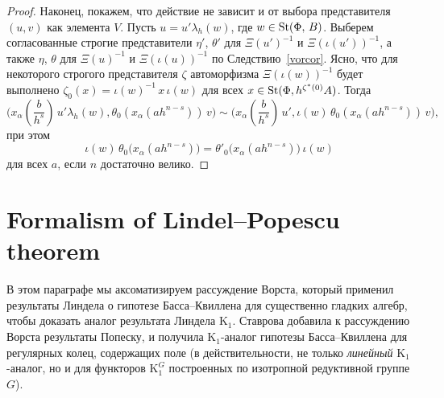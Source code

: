 \documentclass[oneside, 11pt]{amsart} \pdfoutput=1
\begin{document}
\begin{proof}
Наконец, покажем, что действие не зависит и от выбора представителя $(u, v)$ как элемента $V$. Пусть $u = u' \lambda_h(w)$, где $w \in \mathop{\mathrm{St}}\nolimits(\Phi,\,B)$. Выберем согласованные строгие представители $\eta'$, $\theta'$ для $\Xi(u')^{-1}$ и $\Xi(\iota(u'))^{-1}$, а также $\eta$, $\theta$ для $\Xi(u)^{-1}$ и $\Xi(\iota(u))^{-1}$ по Следствию~\ref{vorcor}. Ясно, что для некоторого строгого представителя $\zeta$ автоморфизма $\Xi(\iota(w))^{-1}$ будет выполнено $\zeta_0(x) = \iota(w)^{-1}\, x\, \iota(w)$ для всех $x \in \mathop{\mathrm{St}}\nolimits(\Phi, h^{\zeta^*(0)} A)$.
Тогда
$$\textstyle
\bigl(x_\alpha(\frac b {h^s})\, u' \lambda_h(w), \theta_0(x_\alpha(ah^{n - s}))\, v\bigr) \sim \bigl(x_\alpha(\frac b {h^s})\, u', \iota(w)\, \theta_0(x_\alpha(ah^{n - s}))\, v\bigr),
$$
при этом
$$
\iota(w)\, \theta_0\big(x_\alpha(ah^{n-s})\big) = \theta'_0\big(x_\alpha(ah^{n-s})\big)\, \iota(w)
$$
для всех \(a\), если \(n\) достаточно велико.
\end{proof}










\section{Formalism of Lindel--Popescu theorem}
В этом параграфе мы аксоматизируем рассуждение Ворста, который применил результаты Линдела о гипотезе Басса--Квиллена для существенно гладких алгебр, чтобы доказать аналог результата Линдела $\mathrm K_1$. Ставрова добавила к рассуждению Ворста результаты Попеску, и получила $\mathrm K_1$-аналог гипотезы Басса--Квиллена для регулярных колец, содержащих поле (в действительности, не только {\it линейный} $\mathrm K_1$-аналог, но и для функторов $\mathrm K_1^G$ построенных по изотропной редуктивной группе $G$).
\end{document}
